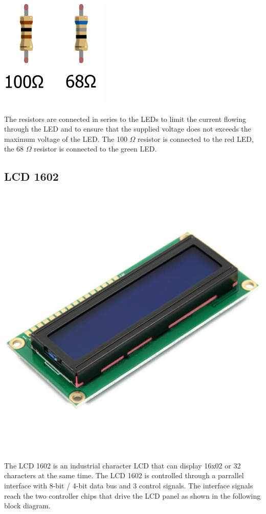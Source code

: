 \documentclass[]{article}
\begin{document}
\begin{center}
    \includegraphics{resistors}
\end{center}
The resistors are connected in series to the LEDs to limit the current flowing through the LED and to ensure that the supplied 
voltage does not exceeds the maximum voltage of the LED. The 100 $ \Omega $ resistor is connected to the red LED, the 68 $ \Omega $ 
resistor is connected to the green LED.

\subsection{LCD 1602}

\begin{center}
    \includegraphics[scale=0.2]{lcd}
\end{center}
The LCD 1602 is an industrial character LCD that can display 16x02 or 32 characters at the same time. 
The LCD 1602 is controlled through a parrallel interface with 8-bit / 4-bit data bus and 3 control signals. 
The interface signals reach the two controller chips that drive the LCD panel as shown in the following block diagram.
\end{document}
